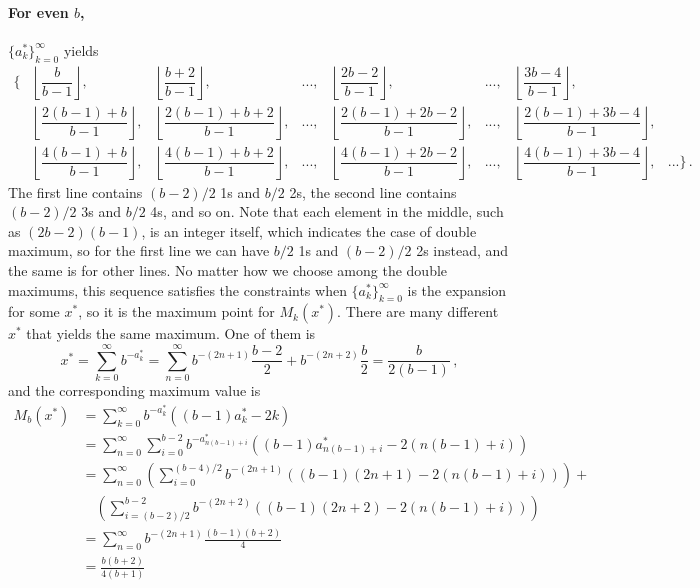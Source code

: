 \documentclass[]{article}
\begin{document}
\paragraph{For even $b$,} $\{a_k^*\}_{k=0}^{\infty}$ yields
\[
\begin{matrix}
\Big\{&\left\lfloor\dfrac{b}{b-1}\right\rfloor,&\left\lfloor\dfrac{b + 2}{b-1}\right\rfloor, &...,&\left\lfloor\dfrac{2b - 2}{b-1}\right\rfloor, &...,&\left\lfloor\dfrac{3b - 4}{b-1}\right\rfloor,&\\
&\left\lfloor\dfrac{2(b-1) + b}{ b-1}\right\rfloor,&\left\lfloor\dfrac{2(b-1) + b + 2}{b-1}\right\rfloor, &...,&\left\lfloor\dfrac{2(b-1) +  2b - 2}{b-1}\right\rfloor, &...,&\left\lfloor\dfrac{2(b-1) + 3b - 4}{b-1}\right\rfloor,&\\
&\left\lfloor\dfrac{4(b-1) + b}{ b-1}\right\rfloor,&\left\lfloor\dfrac{4(b-1) + b + 2}{b-1}\right\rfloor, &...,&\left\lfloor\dfrac{4(b-1) +  2b - 2}{b-1}\right\rfloor, &...,&\left\lfloor\dfrac{4(b-1) + 3b - 4}{b-1}\right\rfloor,&...\Big\}\,.
\end{matrix}
\]
The first line contains $(b-2)/2$ 1s and $b/2$ 2s, the second line contains $(b-2)/2$ 3s and $b/2$ 4s, and so on. Note that each element in the middle, such as $(2b-2)(b-1)$, is an integer itself, which indicates the case of double maximum, so for the first line we can have $b/2$ 1s and $(b-2)/2$ 2s instead, and the same is for other lines. No matter how we choose among the double maximums, this sequence satisfies the constraints when $\{a_k^*\}_{k=0}^{\infty}$ is the expansion for some $x^*$, so it is the maximum point for $M_k(x^*)$. There are many different $x^*$ that yields the same maximum. One of them is
\[
x^* = \sum_{k=0}^\infty b^{-a_k^*} 
    = \sum_{n=0}^\infty b^{-(2n+1)}\frac{b-2}{2} + b^{-(2n+2)} \frac{b}{2} = \frac{b}{2(b-1)}\,,
\]
and the corresponding maximum value is
\begin{align*}
M_b(x^*) &= \sum_{k=0}^\infty b^{-a_k^*}((b-1)a_k^*-2k)\\
&=\sum_{n=0}^\infty \sum_{i=0}^{b-2} b^{-a_{n(b-1)+i}^*}((b-1)a_{n(b-1)+i}^*-2(n(b-1)+i))\\
&=\sum_{n=0}^\infty \left(\sum_{i=0}^{(b-4)/2} b^{-(2n+1)}((b-1)(2n+1)-2(n(b-1)+i))\right) +\\&\quad \left(\sum_{i=(b-2)/2}^{b-2} b^{-(2n+2)}((b-1)(2n+2)-2(n(b-1)+i))\right)\\
&=\sum_{n=0}^\infty   b^{-(2 n +1)}\frac{(b - 1) (b + 2)}{4} \\
&=\frac{b(b+2)}{4(b+1)}
\end{align*}
\end{document}
